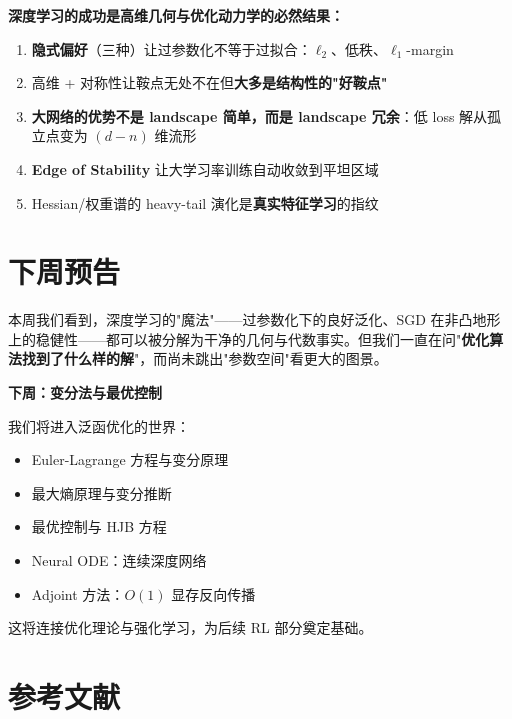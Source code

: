 \documentclass[12pt, a4paper]{ctexart}
\begin{document}
\begin{keypoint}[本周的核心信息]
\textbf{深度学习的成功是高维几何与优化动力学的必然结果：}
\begin{enumerate}
    \item \textbf{隐式偏好}（三种）让过参数化不等于过拟合：$\ell_2$、低秩、$\ell_1$-margin
    \item 高维 + 对称性让鞍点无处不在但\textbf{大多是结构性的"好鞍点"}
    \item \textbf{大网络的优势不是 landscape 简单，而是 landscape 冗余}：低 loss 解从孤立点变为 $(d-n)$ 维流形
    \item \textbf{Edge of Stability} 让大学习率训练自动收敛到平坦区域
    \item Hessian/权重谱的 heavy-tail 演化是\textbf{真实特征学习}的指纹
\end{enumerate}
\end{keypoint}


\section{下周预告}

本周我们看到，深度学习的"魔法"——过参数化下的良好泛化、SGD 在非凸地形上的稳健性——都可以被分解为干净的几何与代数事实。但我们一直在问"\textbf{优化算法找到了什么样的解}"，而尚未跳出"参数空间"看更大的图景。

\textbf{下周：变分法与最优控制}

我们将进入泛函优化的世界：
\begin{itemize}
    \item Euler-Lagrange 方程与变分原理
    \item 最大熵原理与变分推断
    \item 最优控制与 HJB 方程
    \item Neural ODE：连续深度网络
    \item Adjoint 方法：$O(1)$ 显存反向传播
\end{itemize}

这将连接优化理论与强化学习，为后续 RL 部分奠定基础。


\section{参考文献}
\end{document}
